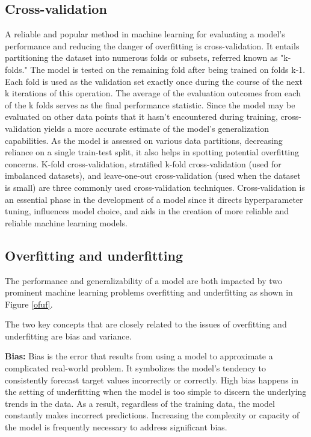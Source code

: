 \documentclass[a4paper,12pt]{report}%
\renewcommand{\\}{\vspace*{0.5\baselineskip} \newline}
\begin{document}
\subsection{Cross-validation}
A reliable and popular method in machine learning for evaluating a model's performance and reducing the danger of overfitting is cross-validation. It entails partitioning the dataset into numerous folds or subsets, referred known as "k-folds." The model is tested on the remaining fold after being trained on folds k-1. Each fold is used as the validation set exactly once during the course of the next k iterations of this operation. The average of the evaluation outcomes from each of the k folds serves as the final performance statistic. Since the model may be evaluated on other data points that it hasn't encountered during training, cross-validation yields a more accurate estimate of the model's generalization capabilities.
As the model is assessed on various data partitions, decreasing reliance on a single train-test split, it also helps in spotting potential overfitting concerns. K-fold cross-validation, stratified k-fold cross-validation (used for imbalanced datasets), and leave-one-out cross-validation (used when the dataset is small) are three commonly used cross-validation techniques. Cross-validation is an essential phase in the development of a model since it directs hyperparameter tuning, influences model choice, and aids in the creation of more reliable and reliable machine learning models.

\subsection{Overfitting and underfitting}
The performance and generalizability of a model are both impacted by two prominent machine learning problems overfitting and underfitting as shown in Figure \ref{ofuf}.

\noindent The two key concepts that are closely related to the issues of overfitting and underfitting are bias and variance.

\bigskip
\noindent\textbf{Bias:} Bias is the error that results from using a model to approximate a complicated real-world problem. It symbolizes the model's tendency to consistently forecast target values incorrectly or correctly. High bias happens in the setting of underfitting when the model is too simple to discern the underlying trends in the data. As a result, regardless of the training data, the model constantly makes incorrect predictions. Increasing the complexity or capacity of the model is frequently necessary to address significant bias.
\end{document}
